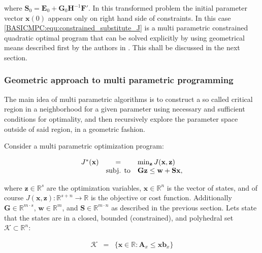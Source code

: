     where $\textbf{S}_0=\textbf{E}_0+\textbf{G}_0\textbf{H}^{-1}\textbf{F}'$. In this transformed problem the initial parameter vector $\textbf{x}(0)$ appears only on right hand side of constraints. In this case \ref{BASICMPC:equ:constrained_substitute_J} is a multi parametric constrained quadratic optimal program that can be solved explicitly by using geometrical means described first by the authors in \cite{bemporad2002explicit}. This shall be discussed in the next section.

    \subsubsection{Geometric approach to multi parametric programming}\label{BASICCSR:sec:MPP}

    The main idea of multi parametric algorithms is to construct a so called critical region in a neighborhood for a given parameter using necessary and sufficient conditions for optimality, and then recursively explore the parameter space outside of said region, in a geometric fashion.

    \label{BASICCSR:sec:MPP_Linear}

    Consider a multi parametric optimization program:

    \begin{equation}
    \begin{array}{rcl}
            J^*(\textbf{x})&=&\min_{\textbf{z}}J(\textbf{x},\textbf{z})\\
            &\textnormal{subj. to}&\textbf{Gz}\leq\textbf{w}+\textbf{Sx},
        \end{array}
        \label{BASICMPC:equ:MPP_program}
    \end{equation}

    where $\textbf{z}\in\mathbb{R}^s$ are the optimization variables,  $\textbf{x}\in\mathbb{R}^n$ is the vector of states, and of course $J(\textbf{x},\textbf{z}):\mathbb{R}^{s+n}\rightarrow\mathbb{R}$ is the objective or cost function. Additionally $\textbf{G}\in\mathbb{R}^{m\cdot s}$, $\textbf{w}\in\mathbb{R}^m$, and $\textbf{S}\in\mathbb{R}^{m\cdot n}$ as described in the previous section. Lets state that the states are in a closed, bounded (constrained), and polyhedral set $\mathcal{K}\subset\mathbb{R}^n$:

    \begin{equation}
    \begin{array}{rcl}
            \mathcal{K}&=&\{\textbf{x}\in\mathbb{R}:\textbf{A}_x\leq\textbf{xb}_x\}
        \end{array}
        \label{BASICMPC:equ:MPP_stateset}
    \end{equation}

